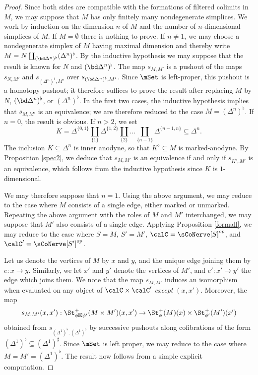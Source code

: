 \begin{proof}
Since both sides are compatible with the formations of filtered colimits in $M$, we may suppose that $M$ has only finitely many nondegenerate simplices. 
We work by induction on the dimension $n$ of $M$ and the number of $n$-dimensional simplices of $M$. If $M = \emptyset$ there is nothing to prove. If $n \neq 1$, we may choose a nondegenerate simplex of $M$ having maximal dimension and thereby write 
$M = N \coprod_{ (\bd \Delta^n)^{\flat} } (\Delta^n)^{\flat}$. By the inductive hypothesis we may suppose that the result is known
for $N$ and $(\bd \Delta^n)^{\flat}$. The map $s_{M,M'}$ is a pushout of the maps
$s_{N,M'}$ and $s_{ (\Delta^n)^{\flat}, M'}$ over $s_{ (\bd \Delta^n)^{\flat}, M' }$.
Since $\mSet$ is left-proper, this pushout is a homotopy pushout; it therefore suffices to prove the result after replacing $M$ by $N$, $(\bd \Delta^n)^{\flat}$, or $(\Delta^n)^{\flat}$. In the first two cases, the inductive hypothesis implies that $s_{M,M'}$ is an equivalence; we are therefore reduced to the case $M = (\Delta^n)^{\flat}$. If $n=0$, the result is obvious. If $n>2$, we set $$K = \Delta^{ \{0,1\} } \coprod_{ \{1\} } \Delta^{ \{1,2\} } \coprod_{ \{2\} } \ldots \coprod_{ \{n-1\} } \Delta^{ \{n-1, n\} } \subseteq \Delta^n.$$
The inclusion $K \subseteq \Delta^n$ is inner anodyne, so that $K^{\flat} \subseteq M$ is marked-anodyne. By Proposition \ref{spec2}, we deduce that $s_{M,M'}$ is an equivalence if and only if $s_{K^{\flat}, M'}$ is an equivalence, which follows from the inductive hypothesis since $K$ is $1$-dimensional.

We may therefore suppose that $n=1$. Using the above argument, we may reduce to the case where $M$ consists of a single edge, either marked or unmarked. Repeating the above argument with the roles of $M$ and $M'$ interchanged, we may suppose that $M'$ also consists of a single edge. Applying Proposition \ref{formall}, we may reduce to the case where $S = M$, $S' = M'$, $\calC = \sCoNerve[S]^{op}$, and $\calC' = \sCoNerve[S']^{op}$.

Let us denote the vertices of $M$ by $x$ and $y$, and the unique edge joining them by
$e: x \rightarrow y$. Similarly, we let $x'$ and $y'$ denote the vertices of $M'$, and $e': x' \rightarrow y'$ the edge which joins them. We note that the map
$s_{M,M'}$ induces an isomorphism when evaluated on any object of $\calC \times \calC'$
{\em except} $(x,x')$. Moreover, the map
$$s_{M,M'}(x,x'): \St^{+}_{\phi \boxtimes \phi'}(M \times M')(x,x') \rightarrow \St^{+}_{\phi}(M)(x) \times \St^{+}_{\phi'}(M')(x')$$
obtained from $s_{ (\Delta^1)^{\flat}, (\Delta^1)^{\flat}}$ by successive pushouts
along cofibrations of the form $(\Delta^1)^{\flat} \subseteq (\Delta^1)^{\sharp}$. Since $\mSet$ is left proper, we may reduce to the case where $M = M' = (\Delta^1)^{\flat}$. The result now follows from a simple explicit computation.
\end{proof}

